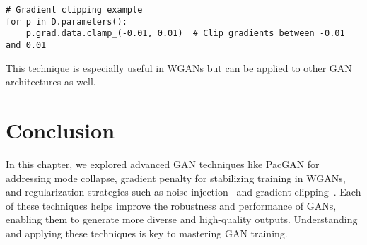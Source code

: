 \begin{lstlisting}[style=python]
# Gradient clipping example
for p in D.parameters():
    p.grad.data.clamp_(-0.01, 0.01)  # Clip gradients between -0.01 and 0.01
\end{lstlisting}

This technique is especially useful in WGANs but can be applied to other GAN architectures as well.

\section{Conclusion}

In this chapter, we explored advanced GAN techniques like PacGAN for addressing mode collapse, gradient penalty for stabilizing training in WGANs, and regularization strategies such as noise injection~\cite{feng2021understanding} and gradient clipping~\cite{zhang2019gradient}. Each of these techniques helps improve the robustness and performance of GANs, enabling them to generate more diverse and high-quality outputs. Understanding and applying these techniques is key to mastering GAN training.
